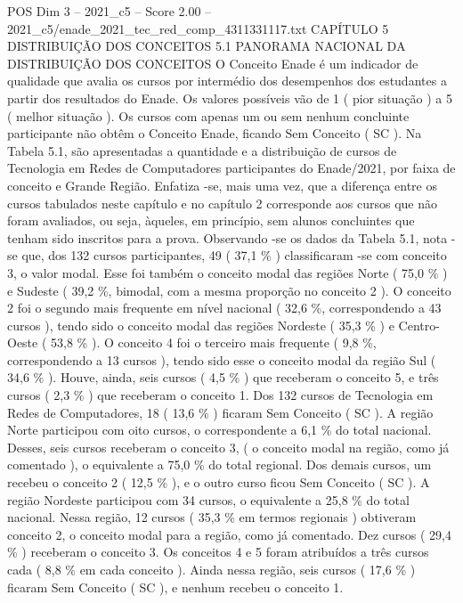 \begin{textsample}{POS Dim 3 – 2021\_c5 – Score 2.00 – 2021\_c5/enade\_2021\_tec\_red\_comp\_4311331117.txt}  \label{ex:f3_pos_086}
CAPÍTULO 5 DISTRIBUIÇÃO DOS CONCEITOS 5.1 PANORAMA NACIONAL DA DISTRIBUIÇÃO DOS CONCEITOS O Conceito Enade é um indicador de qualidade que avalia os cursos por intermédio dos desempenhos dos estudantes a partir dos resultados do Enade.
Os valores possíveis vão de 1 ( pior situação ) a 5 ( melhor situação ).
Os cursos com apenas um ou sem nenhum concluinte participante não obtêm o Conceito Enade, ficando Sem Conceito ( SC ).
Na Tabela 5.1, são apresentadas a quantidade e a distribuição de cursos de Tecnologia em Redes de Computadores participantes do Enade/2021, por faixa de conceito e Grande Região.
Enfatiza -se, mais uma vez, que a diferença entre os cursos tabulados neste capítulo e no capítulo 2 corresponde aos cursos que não foram avaliados, ou seja, àqueles, em princípio, sem alunos concluintes que tenham sido inscritos para a prova.
Observando -se os dados da Tabela 5.1, nota -se que, dos 132 cursos participantes, 49 ( 37,1 \% ) classificaram -se com conceito 3, o valor modal.
Esse foi também o conceito modal das regiões Norte ( 75,0 \% ) e Sudeste ( 39,2 \%, bimodal, com a mesma proporção no conceito 2 ).
O conceito 2 foi o segundo mais frequente em nível nacional ( 32,6 \%, correspondendo a 43 cursos ), tendo sido o conceito modal das regiões Nordeste ( 35,3 \% ) e Centro-Oeste ( 53,8 \% ).
O conceito 4 foi o terceiro mais frequente ( 9,8 \%, correspondendo a 13 cursos ), tendo sido esse o conceito modal da região Sul ( 34,6 \% ).
Houve, ainda, seis cursos ( 4,5 \% ) que receberam o conceito 5, e três cursos ( 2,3 \% ) que receberam o conceito 1.
Dos 132 cursos de Tecnologia em Redes de Computadores, 18 ( 13,6 \% ) ficaram Sem Conceito ( SC ).
A região Norte participou com oito cursos, o correspondente a 6,1 \% do total nacional.
Desses, seis cursos receberam o conceito 3, ( o conceito modal na região, como já comentado ), o equivalente a 75,0 \% do total regional.
Dos demais cursos, um recebeu o conceito 2 ( 12,5 \% ), e o outro curso ficou Sem Conceito ( SC ).
A região Nordeste participou com 34 cursos, o equivalente a 25,8 \% do total nacional.
Nessa região, 12 cursos ( 35,3 \% em termos regionais ) obtiveram conceito 2, o conceito modal para a região, como já comentado.
Dez cursos ( 29,4 \% ) receberam o conceito 3.
Os conceitos 4 e 5 foram atribuídos a três cursos cada ( 8,8 \% em cada conceito ).
Ainda nessa região, seis cursos ( 17,6 \% ) ficaram Sem Conceito ( SC ), e nenhum recebeu o conceito 1.

\end{textsample}
